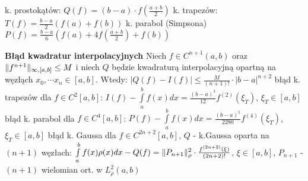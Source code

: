 
\entry
k. prostokątów:
	\(
		Q(f) = (b-a)\cdot f(\frac{a+b}{2})
	\)
\entry
k. trapezów:
	\(
		T(f) = \frac{b-a}{2}(f(a)+f(b))
	\)
\entry
k. parabol (Simpsona)
	\(
		P(f) = \frac{b-a}{6}(f(a) + 4f(\frac{a+b}{2})+f(b))
	\)

\entry
\textbf{Błąd kwadratur interpolacyjnych}
	Niech $f \in C^{n+1}(a, b)$ oraz $\|f^{n+1}\|_{\infty, [a, b]} \leq M$ i niech $Q$ będzie kwadraturą interpolacyjną opartną na węzłąch $x_0, \cdots x_n \in [a, b]$. Wtedy:
	\(
		|Q(f) - I(f)| \leq \frac{M}{(n+1)!} \cdot |b-a|^{n+2}
	\)
\entry
błąd k. trapezów dla $f \in C^2[a, b]$:
		\(
			I(f) - \int\limits_a^bf(x)dx = \frac{(b-a)^3}{12}f^{(2)}(\xi_T)
		\), $\xi_T \in [a, b]$
\entry
błąd k. parabol dla $f \in C^4[a, b]$:
		\(
			P(f) - \int\limits_a^bf(x)dx = \frac{(b-a)^5}{2280}f^{(4)}(\xi_T)
		\), $\xi_T \in [a, b]$
\entry
błąd k. Gaussa dla $f \in  C^{2n+2}[a, b]$, $Q$ - k.Gaussa oparta na $(n+1)$ węzłach:
	\(
		\int\limits_a^b f(x)\rho(x)dx - Q(f) = \|P_{n+1}\|^2_\rho\cdot \frac{f^{(2n+2)}(\xi)}{(2n+2)!}
	\), $\xi \in [a, b]$, $P_{n+1}$ - $(n+1)$ wielomian ort. w $L^2_\rho(a, b)$
